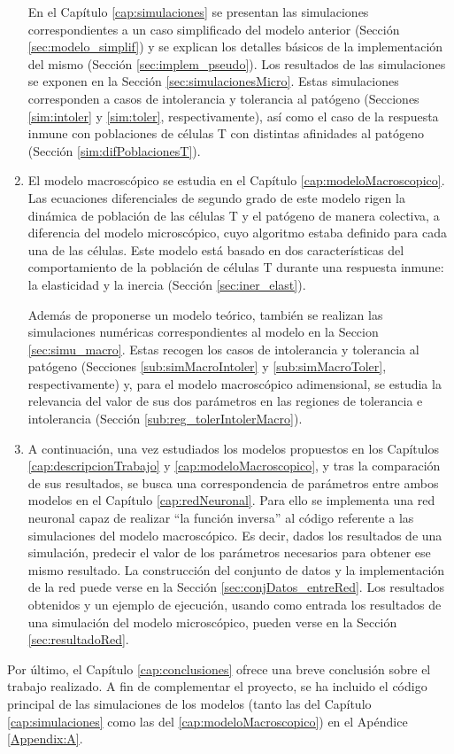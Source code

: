 \begin{enumerate}
	En el Capítulo \ref{cap:simulaciones} se presentan las simulaciones correspondientes a un caso simplificado del modelo anterior (Sección \ref{sec:modelo_simplif}) y se explican los detalles básicos de la implementación del mismo (Sección \ref{sec:implem_pseudo}). Los resultados de las simulaciones se exponen en la Sección \ref{sec:simulacionesMicro}. Estas simulaciones corresponden a casos de intolerancia y tolerancia al patógeno (Secciones \ref{sim:intoler} y \ref{sim:toler}, respectivamente), así como el caso de la respuesta inmune con poblaciones de células T con distintas afinidades al patógeno (Sección \ref{sim:difPoblacionesT}).
	
	
	\item El modelo macroscópico se estudia en el Capítulo \ref{cap:modeloMacroscopico}. Las ecuaciones diferenciales de segundo grado de este modelo rigen la dinámica de población de las células T y el patógeno de manera colectiva, a diferencia del modelo microscópico, cuyo algoritmo estaba definido para cada una de las células. Este modelo está basado en dos características del comportamiento de la población de células T durante una respuesta inmune: la elasticidad y la inercia (Sección \ref{sec:iner_elast}). 
	
	Además de proponerse un modelo teórico, también se realizan las simulaciones numéricas correspondientes al modelo en la Seccion \ref{sec:simu_macro}. Estas recogen los casos de intolerancia y tolerancia al patógeno (Secciones \ref{sub:simMacroIntoler} y \ref{sub:simMacroToler}, respectivamente) y, para el modelo macroscópico adimensional, se estudia la relevancia del valor de sus dos parámetros en las regiones de tolerancia e intolerancia (Sección \ref{sub:reg_tolerIntolerMacro}).
	
	\item A continuación, una vez estudiados los modelos propuestos en los Capítulos \ref{cap:descripcionTrabajo} y \ref{cap:modeloMacroscopico}, y tras la comparación de sus resultados, se busca una correspondencia de parámetros entre ambos modelos en el Capítulo \ref{cap:redNeuronal}. Para ello se implementa una red neuronal capaz de realizar ``la función inversa'' al código referente a las simulaciones del modelo macroscópico. Es decir, dados los resultados de una simulación, predecir el valor de los parámetros necesarios para obtener ese mismo resultado. La construcción del conjunto de datos y la implementación de la red puede verse en la Sección \ref{sec:conjDatos_entreRed}. Los resultados obtenidos y un ejemplo de ejecución, usando como entrada los resultados de una simulación del modelo microscópico, pueden verse en la Sección \ref{sec:resultadoRed}.
	
\end{enumerate}

Por último, el Capítulo \ref{cap:conclusiones} ofrece una breve conclusión sobre el trabajo realizado. A fin de complementar el proyecto, se ha incluido el código principal de las simulaciones de los modelos (tanto las del Capítulo \ref{cap:simulaciones} como las del \ref{cap:modeloMacroscopico}) en el Apéndice \ref{Appendix:A}.






